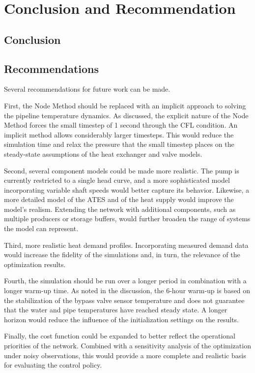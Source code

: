 \chapter{Conclusion and Recommendation}
\label{chapter:conclusion}

\section{Conclusion}




\section{Recommendations}
Several recommendations for future work can be made. 

First, the Node Method should be replaced with an implicit 
approach to solving the pipeline temperature dynamics. As discussed, the 
explicit nature of the Node Method forces the small timestep of 1 second 
through the CFL condition. An implicit method allows considerably larger timesteps. This would reduce the simulation time and relax the pressure that the small timestep places on the steady-state assumptions of the heat exchanger and valve models.

Second, several component models could be made more realistic. The pump is 
currently restricted to a single head curve, and a more sophisticated model incorporating variable shaft speeds would better capture its behavior. Likewise, a more detailed model of the ATES and of the heat supply would improve the model's realism. Extending the network with additional components, such as multiple producers or storage 
buffers, would further broaden the range of systems the model can represent.

Third, more realistic heat demand profiles. Incorporating measured demand data would increase the fidelity of the simulations and, in turn, the relevance of the optimization results.

Fourth, the simulation should be run over a longer period in combination with a longer warm-up time. As noted in the discussion, the 6-hour warm-up is based on the stabilization of the bypass valve sensor temperature and does not guarantee that the water and pipe temperatures have reached steady state. A longer horizon would reduce the influence of the initialization settings on the results.

Finally, the cost function could be expanded to better reflect the operational priorities of the network. Combined with a sensitivity analysis of the optimization under noisy observations, this would provide a more complete and realistic basis for evaluating the control policy.





